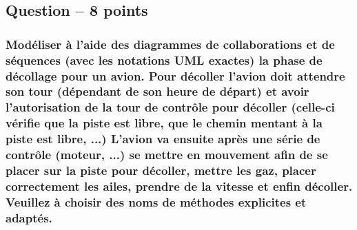 \subsection{Question – 8 points}



\subsubsection[Fournir un diagramme de collaboration et de séquence complets sur un aéroport]{Modéliser à l'aide des diagrammes de collaborations et de séquences (avec les notations UML exactes) la phase de décollage pour un avion. Pour décoller l'avion doit attendre son tour (dépendant de son heure de départ) et avoir l'autorisation de la tour de contrôle pour décoller (celle-ci vérifie que la piste est libre, que le chemin mentant à la piste est libre, ...) L'avion va ensuite après une série de contrôle (moteur, ...) se mettre en mouvement afin de se placer sur la piste pour décoller, mettre les gaz, placer correctement les ailes, prendre de la vitesse et enfin décoller. Veuillez à choisir des noms de méthodes explicites et adaptés.}
\begin{center}
    \color[rgb]{0,0.48,0.58}
\end{center}